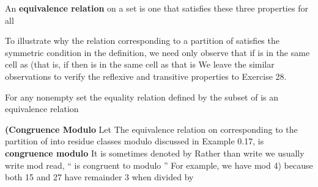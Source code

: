 \documentclass[11pt,oneside]{article}
\begin{document}
\begin{BookBody}
 An\textbf{ equivalence relation}  on a set  is one that satisfies these three properties for all 



 \BookEnd{\blacksquare}

To illustrate why the relation  corresponding to a partition of  satisfies the symmetric condition in the definition, we need only observe that if  is in the same cell as  (that is, if  then  is in the same cell as that is We leave the similar observations to verify the reflexive and transitive properties to Exercise 28.

 For any nonempty set  the equality relation \BookInline{= } defined by the subset  of  is an equivalence relation\BookEnd{\blacktriangle}

 \textbf{(Congruence Modulo}  Let  The equivalence relation on  corresponding to the partition of  into residue classes modulo  discussed in Example 0.17, is\textbf{ con}\textbf{gruence modulo}  It is sometimes denoted by  Rather than write  we usually write mod  read, “ is congruent to  modulo ” For example, we have mod 4) because both 15 and 27 have remainder 3 when divided by \BookEnd{\blacktriangle}

\end{BookBody}

\BookNarrativetrue
\end{document}
